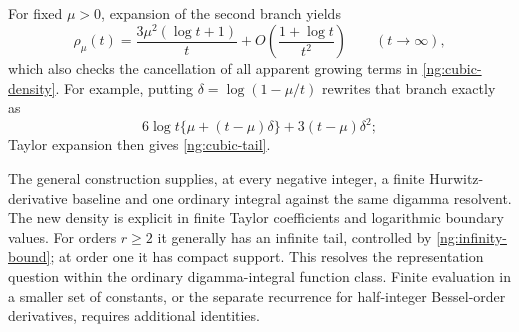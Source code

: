 \begin{remark}
\label{ng:scope}
For fixed $\mu>0$, expansion of the second branch yields
\begin{equation}
 \rho_\mu(t)=\frac{3\mu^2(\log t+1)}{t}
                  +O\left(\frac{1+\log t}{t^2}\right)
                       \qquad(t\to\infty),
 \label{ng:cubic-tail}
\end{equation}
which also checks the cancellation of all apparent growing
terms in \eqref{ng:cubic-density}.
For example, putting $\delta=\log(1-\mu/t)$ rewrites that
branch exactly as
\[
 6\log t\{\mu+(t-\mu)\delta\}+3(t-\mu)\delta^2;
\]
Taylor expansion then gives \eqref{ng:cubic-tail}.

The general construction supplies, at every negative integer,
a finite Hurwitz-derivative baseline and one ordinary integral
against the same digamma resolvent.  The new density is explicit
in finite Taylor coefficients and logarithmic boundary values.
For orders $r\geq2$ it generally has an infinite tail, controlled
by \eqref{ng:infinity-bound}; at order one it has compact support.
This resolves the representation question within the ordinary
digamma-integral function class.  Finite evaluation in a smaller
set of constants, or the separate recurrence for half-integer Bessel-order
derivatives, requires additional identities.
\end{remark}
